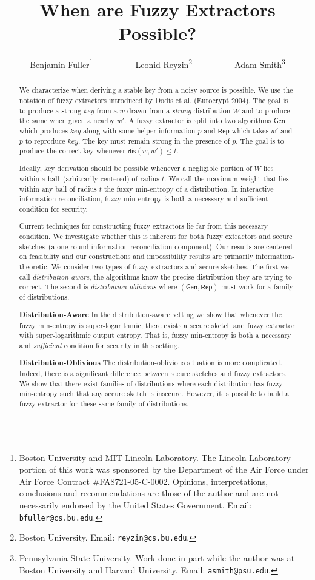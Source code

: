 \documentclass[11pt]{article}
\title{When are Fuzzy Extractors Possible?}
\author{Benjamin Fuller\footnote{Boston University and MIT Lincoln Laboratory. The Lincoln Laboratory portion of this
work was sponsored by the Department of the Air Force under Air Force
Contract
\#FA8721-05-C-0002.  Opinions,
interpretations, conclusions and recommendations are those of the author
and
are not necessarily endorsed by the United States Government.  Email: {\tt bfuller@cs.bu.edu}.}~~~~~~~~~~Leonid Reyzin\footnote{Boston University.  Email: {\tt reyzin@cs.bu.edu}.}~~~~~~~~~~Adam Smith\footnote{Pennsylvania State University. Work done in part while the author was at Boston University and Harvard University.  Email: {\tt asmith@psu.edu}.  }}
\newcommand{\class}[1]{{\ensuremath{\mathsf{#1}}}}
\newcommand{\gen}{\ensuremath{\class{Gen}}\xspace}
\newcommand{\rep}{\ensuremath{\class{Rep}}\xspace}
\newcommand{\dis}{\ensuremath{\mathsf{dis}}}
\begin{document}
\maketitle

\begin{abstract}
We characterize when deriving a stable key from a noisy source is possible.  We use the notation of fuzzy extractors introduced by Dodis et al. (Eurocrypt 2004).  The goal is to produce a strong $key$ from a $w$ drawn from a \emph{strong} distribution $W$ and to produce the same when given a nearby $w'$.  A fuzzy extractor is split into two algorithms $\gen$ which produces $key$ along with some helper information $p$ and $\rep$ which takes $w'$ and $p$ to reproduce $key$.  The key must remain strong in the presence of $p$.  The goal is to produce the correct key whenever $\dis(w, w')\le t$.

Ideally, key derivation should be possible whenever a negligible portion of $W$ lies within a ball~(arbitrarily centered) of radius $t$.  We call the maximum weight that lies within any ball of radius $t$ the fuzzy min-entropy of a distribution.  In interactive information-reconciliation, fuzzy min-entropy is both a necessary and sufficient condition for security.  

Current techniques for constructing fuzzy extractors lie far from this necessary condition.  We investigate whether this is inherent for both fuzzy extractors and secure sketches~(a one round information-reconciliation component).  Our results are centered on feasibility and our constructions and impossibility results are primarily information-theoretic.  We consider two types of fuzzy extractors and secure sketches.  The first we call \emph{distribution-aware}, the algorithms know the precise distribution they are trying to correct.  The second is \emph{distribution-oblivious} where $(\gen, \rep)$ must work for a family of distributions.

\textbf{Distribution-Aware} In the distribution-aware setting we show that whenever the fuzzy min-entropy is super-logarithmic, there exists a secure sketch and fuzzy extractor with super-logarithmic output entropy.  That is, fuzzy min-entropy is both a necessary and \emph{sufficient} condition for security in this setting.

\textbf{Distribution-Oblivious} The distribution-oblivious situation is more complicated.  Indeed, there is a significant difference between secure sketches and fuzzy extractors.  We show that there exist families of distributions where each distribution has fuzzy min-entropy such that any secure sketch is insecure.  However, it is possible to build a fuzzy extractor for these same family of distributions.
\end{abstract}
\end{document}
